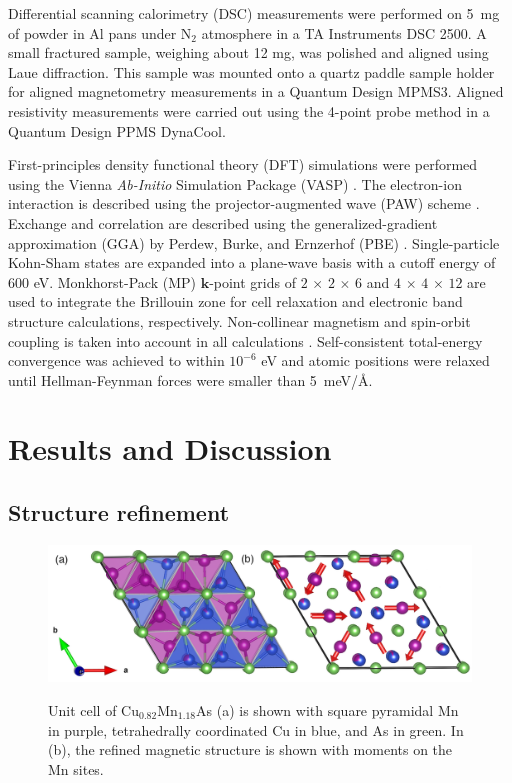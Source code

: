 \documentclass[10pt,doublespacing,edeposit]{uiucthesis2020}
\begin{document}
\begin{mainmatter}
Differential scanning calorimetry (DSC) measurements were performed on 5~mg of powder in Al pans under N$_2$ atmosphere in a TA Instruments DSC 2500. A small fractured sample, weighing about 12 mg, was polished and aligned using Laue diffraction. This sample was mounted onto a quartz paddle sample holder for aligned magnetometry measurements in a Quantum Design MPMS3. Aligned resistivity measurements were carried out using the 4-point probe method in a Quantum Design PPMS DynaCool.

First-principles density functional theory (DFT) simulations were performed using the Vienna \emph{Ab-Initio} Simulation Package  (VASP) \cite{Kresse:1996,Kresse:1999}. The electron-ion interaction is described using the projector-augmented wave (PAW) scheme \cite{Blochl:1994}. Exchange and correlation are described using the generalized-gradient approximation (GGA) by Perdew, Burke, and Ernzerhof  (PBE) \cite{Perdew:1997}. Single-particle Kohn-Sham states are expanded into a plane-wave basis with a cutoff energy of 600 eV. Monkhorst-Pack \cite{Monkhorst:1976} (MP) $\mathbf{k}$-point grids of $2\,\times\,2\,\times\,6$ and $4\,\times\,4\,\times\,12$ are used to integrate the Brillouin zone for cell relaxation and electronic band structure calculations, respectively.
Non-collinear magnetism and spin-orbit coupling is taken into account in all calculations \cite{Steiner2016}.
Self-consistent total-energy convergence was achieved to within $10^{-6}$ eV and atomic positions were relaxed until Hellman-Feynman forces were smaller than 5~meV/\AA.

\section{Results and Discussion}

\subsection{Structure refinement}

\begin{figure}
\centering\includegraphics[width=\columnwidth]{figures/ch5/h-cumnas_1x1_cells_v2.png} \\
\caption{\label{fig:unitcell}
Unit cell of Cu$_{0.82}$Mn$_{1.18}$As (a) is shown with square pyramidal Mn in purple, tetrahedrally coordinated Cu in blue, and As in green.
In (b), the refined magnetic structure is shown with moments on the Mn sites.
} 
\end{figure}


\end{mainmatter}
\end{document}
